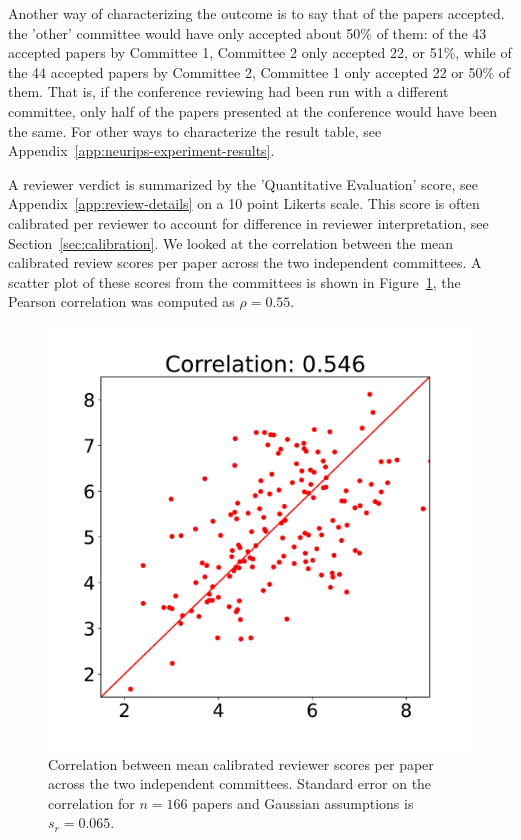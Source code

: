 \documentclass[twoside]{article}
\begin{document}
Another way of characterizing the outcome is to say that of the papers
accepted. the 'other' committee would have only accepted about 50\% of them:
of the 43 accepted papers by Committee 1, Committee 2 only accepted
22, or 51\%, while of the 44 accepted papers by Committee 2, Committee
1 only accepted 22 or 50\% of them. That is, if the conference
reviewing had been run with a different committee, only half of the
papers presented at the conference would have been the same. For other
ways to characterize the result table, see Appendix~\ref{app:neurips-experiment-results}.

A reviewer verdict is summarized by the 'Quantitative Evaluation'
score, see Appendix~\ref{app:review-details} on a 10 point Likerts
scale.  This score is often calibrated per reviewer to account for
difference in reviewer interpretation, see
Section~\ref{sec:calibration}. We looked at the correlation between
the mean calibrated review
scores per paper across the two independent committees. A scatter plot of these
scores from the committees is shown in Figure~\ref{figure-calibrated-quality-correlation}, the Pearson correlation
was computed as $\rho=0.55$. 
\begin{figure}[htb]
\includegraphics[width=0.9\columnwidth]{diagrams/neurips/calibrated-quality-correlation.pdf}

\caption{Correlation between mean calibrated reviewer scores per paper
  across the two
  independent committees. Standard error on the correlation for
  $n=166$ papers and Gaussian assumptions is $s_r = 0.065$.}
\label{figure-calibrated-quality-correlation}
\end{figure}
\end{document}
